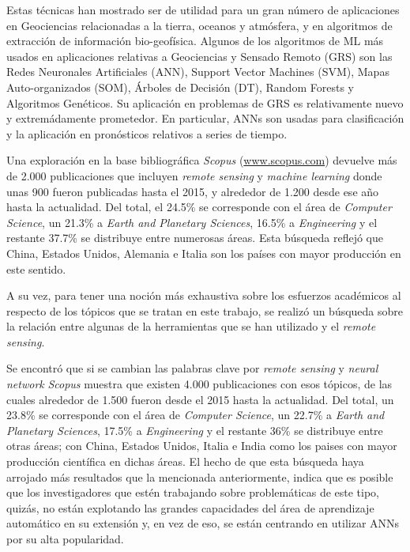     \par Estas técnicas han mostrado ser de utilidad para un gran número de
      aplicaciones en Geociencias relacionadas a la tierra, oceanos y atmósfera,
      y en algoritmos de extracción de información bio-geofísica.
      Algunos de los algoritmos de ML más usados en aplicaciones relativas a
      Geociencias y Sensado Remoto (GRS) son las Redes Neuronales Artificiales (ANN),
      Support Vector Machines (SVM), Mapas Auto-organizados (SOM), Árboles de Decisión (DT),
      Random Forests y Algoritmos Genéticos.
      Su aplicación en problemas de GRS es
      relativamente nuevo y extremádamente prometedor. En particular, ANNs son
      usadas para clasificación y la aplicación en pronósticos
      relativos a series de tiempo.

    \par Una exploración en la base bibliográfica \textit{Scopus} (\url{www.scopus.com})
      devuelve más de 2.000 publicaciones que incluyen \textit{remote sensing} y
      \textit{machine learning} donde unas 900 fueron publicadas hasta el 2015, y
      alrededor de 1.200 desde ese año hasta la actualidad. Del total, el 24.5\% se
      corresponde con el área de \textit{Computer Science}, un 21.3\% a
      \textit{Earth and Planetary Sciences}, 16.5\% a \textit{Engineering} y el
      restante 37.7\% se distribuye entre numerosas áreas. Esta búsqueda reflejó
      que China, Estados Unidos, Alemania e Italia son los países con mayor
      producción en este sentido.

    \par A su vez, para tener una noción más exhaustiva sobre los esfuerzos académicos
      al respecto de los tópicos que se tratan en este trabajo, se realizó un búsqueda
      sobre la relación entre algunas de la herramientas que se han utilizado y
      el \textit{remote sensing}.

    \par Se encontró que si se cambian las palabras clave por
      \textit{remote sensing} y \textit{neural network} \textit{Scopus} muestra
      que existen 4.000 publicaciones con esos tópicos, de las cuales alrededor de
      1.500 fueron desde el 2015 hasta la actualidad. Del total, un 23.8\% se
      corresponde con el área de \textit{Computer Science}, un 22.7\% a
      \textit{Earth and Planetary Sciences}, 17.5\% a \textit{Engineering} y el
      restante 36\% se distribuye entre otras áreas; con China,
      Estados Unidos, Italia e India como los paises con mayor producción
      científica en dichas áreas.
      El hecho de que esta búsqueda haya arrojado más resultados que la mencionada
      anteriormente, indica que es posible que los investigadores que estén trabajando
      sobre problemáticas de este tipo, quizás, no están explotando las grandes
      capacidades del área de aprendizaje automático en su extensión y, en vez de
      eso, se están centrando en utilizar ANNs por su alta popularidad.

